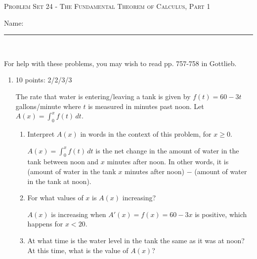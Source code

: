 \documentclass{article}
\begin{document}
\begin{center}
  \large\textsc{Problem Set 24 - The Fundamental Theorem of Calculus, Part 1}
  
      \pspace{12pt}
  \begin{problemonly}\large Name: \rule{5cm}{0.15mm}\\ \end{problemonly}
\end{center}

For help with these problems, you may wish to read pp. 757-758 in Gottlieb.

\begin{enumerate}[topsep=0pt]
\item

\begin{grading}
10 points: 2/2/3/3
\end{grading}

  The rate that water is entering/leaving a tank is given by $f(t)=60-3t$
  gallons/minute where $t$ is measured in minutes past noon.
  Let $A(x)=\displaystyle\int_0^x f(t)\,dt$. 

  \begin{enumerate}[topsep=0pt]

  \item
    \begin{problem}[\vfill]
      Interpret $A (x)$ in words in the context of this problem, for $x\ge 0$.
    \end{problem}

    \begin{solution} %
      $\displaystyle A(x) = \int_0^x f(t)\,dt$ is the net change in the
      amount of water in the tank between noon and $x$ minutes after
      noon.  In other words, it is (amount of water in the tank $x$
      minutes after noon) $-$ (amount of water in the tank at noon).
    \end{solution}

  \item
    \begin{problem}[\vfill]
      For what values of $x$ is $A(x)$ increasing?
    \end{problem}

    \begin{solution} %
      $A(x)$ is increasing when $A'(x) = f(x) = 60 - 3x$ is positive,
      which happens for $\boxed{x < 20}$.
    \end{solution}

  \item
    \begin{problem}[\vfill]
      At what time is the water level in the tank the same as it was at
      noon? At this time, what is the value of $A(x)$?
    \end{problem}


\end{enumerate}
\end{enumerate}
\end{document}
